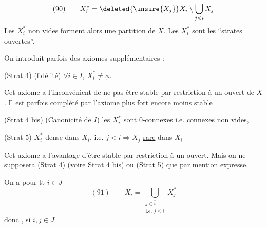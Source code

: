 
\[(90)\qquad X_i^*=\deleted{\unsure{X_j}}X_i\setminus\bigcup_{j<i}X_j\]
Les $X_i^*$ non \uline{vides} forment alors une partition de $X$. Les $X_i^*$ sont les ``strates ouvertes''.

On introduit parfois des axiomes supplémentaires :

(Strat 4) (fidélité) $\forall i\in I$, $X_i^*\neq\phi$.

Cet axiome a l'inconvénient de ne pas être stable par  restriction à un ouvert de $X$. Il est parfois complété par l'axiome plus fort encore moins stable

(Strat 4 bis) (Canonicité de $I$) les $X_i^*$ sont $0$-connexes i.e. connexes non vides,

(Strat 5)  $X_i^*$ dense dans $X_i$,  i.e. $j<i\Rightarrow X_j$ \uline{rare} dans $X_i$

Cet axiome a l'avantage d'être stable par restriction à un ouvert. Mais on ne supposera (Strat 4) (voire Strat 4 bis) ou (Strat 5) que par mention expresse.

On a pour tt $i\in J$
\[
(91)\qquad X_i=\bigcup_{\substack{j\in\bar i\\\text{i.e. }j\leq i}}X_j^*
\]
donc , si $i,j\in J$
